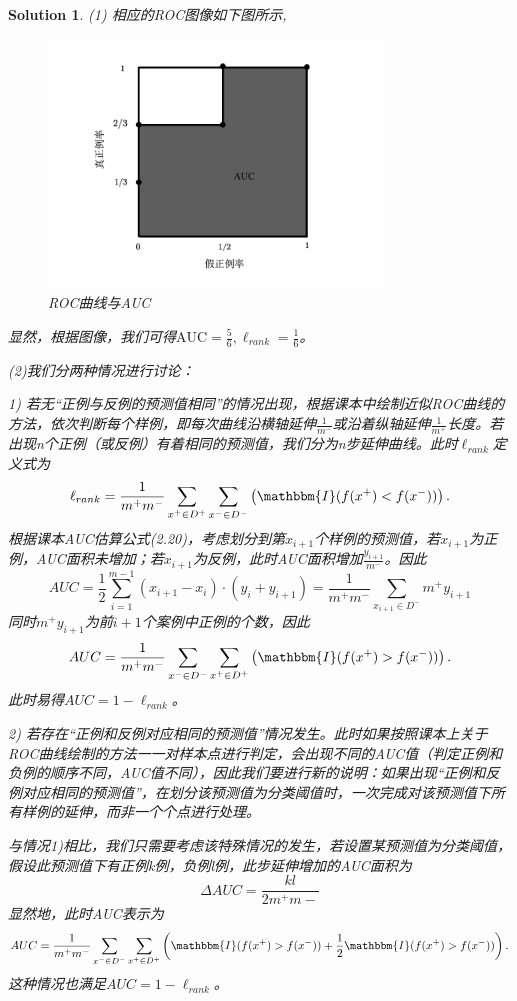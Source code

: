 \documentclass[a4paper,UTF8]{article}
\numberwithin{equation}{section}
\newtheorem*{mySol}{Solution}
\begin{document}
\begin{mySol}
(1) 相应的ROC图像如下图所示,
\begin{figure}[!htb]
\centering\includegraphics[width = 3.5in] {AUC.jpg}
\caption{ROC曲线与AUC}\label{fig:1}
\end{figure}

显然，根据图像，我们可得$\mbox{AUC} = \frac{5}{6}, \ell_{rank} = \frac{1}{6} $。

(2)我们分两种情况进行讨论：

1) 若无“正例与反例的预测值相同”的情况出现，根据课本中绘制近似ROC曲线的方法，依次判断每个样例，即每次曲线沿横轴延伸$\frac{1}{m^-}$或沿着纵轴延伸$\frac{1}{m^+}$长度。若出现n个正例（或反例）有着相同的预测值，我们分为n步延伸曲线。此时$\ell_{rank}$定义式为
\[ \ell_{rank} = \frac{1}{m^+m^-} \sum_{x^+ \in D^+} \sum_{x^- \in D^-} \left (  \mathbbm{I}(f(x^+)<f(x^-)) \right ). \]
根据课本AUC估算公式(2.20)，考虑划分到第$x_{i+1}$个样例的预测值，若$x_{i+1}$为正例，AUC面积未增加；若$x_{i+1}$为反例，此时AUC面积增加$\frac{y_{i+1}}{m^-}$。因此
\[ AUC = \frac{1}{2} \sum_{i=1}^{m-1} (x_{i+1}-x_{i})\cdot (y_i + y_{i+1}) = \frac{1}{m^+m^-} \sum_{x_{i+1} \in D^-}  m^+ y_{i+1} \] 
同时$m^+ y_{i+1} $为前$i+1$个案例中正例的个数，因此
\[ AUC = \frac{1}{m^+m^-} \sum_{x^- \in D^-}  \sum_{x^+ \in D^+} \left (  \mathbbm{I}(f(x^+)>f(x^-)) \right ). \]
此时易得$AUC = 1- \ell_{rank}$。

2) 若存在“正例和反例对应相同的预测值”情况发生。此时如果按照课本上关于ROC曲线绘制的方法一一对样本点进行判定，会出现不同的AUC值（判定正例和负例的顺序不同，AUC值不同），因此我们要进行新的说明：如果出现“正例和反例对应相同的预测值”，在划分该预测值为分类阈值时，一次完成对该预测值下所有样例的延伸，而非一个个点进行处理。

与情况1)相比，我们只需要考虑该特殊情况的发生，若设置某预测值为分类阈值，假设此预测值下有正例k例，负例l例，此步延伸增加的AUC面积为
\[ \Delta AUC = \frac{kl}{2m^+m-} \]
显然地，此时AUC表示为
\[ AUC = \frac{1}{m^+m^-} \sum_{x^- \in D^-}  \sum_{x^+ \in D^+} \left (  \mathbbm{I}(f(x^+)>f(x^-)) + \frac{1}{2}\mathbbm{I}(f(x^+)>f(x^-)) \right ). \] 
这种情况也满足$AUC = 1- \ell_{rank}$。

\end{mySol}
\end{document}

